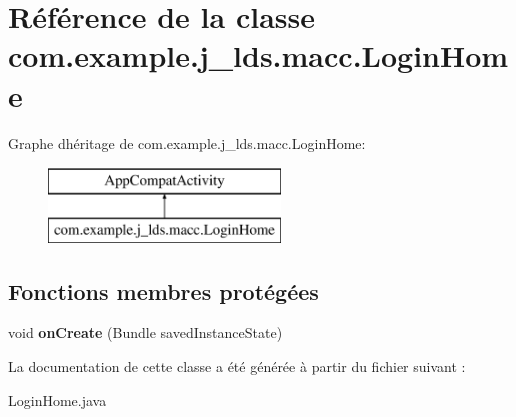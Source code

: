 \hypertarget{a00044}{}\section{Référence de la classe com.\+example.\+j\+\_\+lds.\+macc.\+Login\+Home}
\label{a00044}
Graphe d\textquotesingle{}héritage de com.\+example.\+j\+\_\+lds.\+macc.\+Login\+Home\+:\begin{figure}[H]
\begin{center}
\leavevmode
\includegraphics[height=2.000000cm]{a00044}
\end{center}
\end{figure}
\subsection*{Fonctions membres protégées}
\begin{DoxyCompactItemize}
\item 
\mbox{\label{a00044_ae5a72dc4fded6a8c56a7268952a372ec}} 
void {\bfseries on\+Create} (Bundle saved\+Instance\+State)
\end{DoxyCompactItemize}


La documentation de cette classe a été générée à partir du fichier suivant \+:\begin{DoxyCompactItemize}
\item 
Login\+Home.\+java\end{DoxyCompactItemize}
